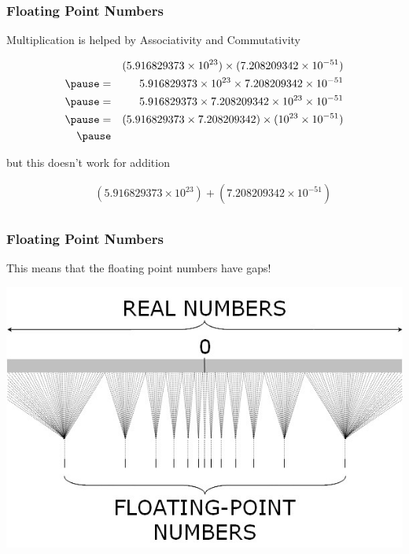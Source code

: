\documentclass{beamer}
\begin{document}
\begin{frame}

\frametitle{Floating Point Numbers}

Multiplication is helped by Associativity and Commutativity

\begin{eqnarray*}
     && (5.916829373 \times 10^{23}) \times (7.208209342 \times 10^{-51}) \\ \pause
  =  && 5.916829373 \times 10^{23} \times 7.208209342 \times 10^{-51} \\ \pause
  =  && 5.916829373 \times 7.208209342 \times 10^{23} \times 10^{-51} \\ \pause
  =  && (5.916829373 \times 7.208209342) \times (10^{23} \times 10^{-51}) \\ \pause
\end{eqnarray*}

but this doesn't work for addition \pause

\begin{eqnarray*}
      && (5.916829373 \times 10^{23}) + (7.208209342 \times 10^{-51}) \\
\end{eqnarray*}

\end{frame}

\begin{frame}

\frametitle{Floating Point Numbers}

This means that the floating point numbers have gaps!

\begin{center}
\includegraphics[scale=.6]{float-gaps.jpg}
\end{center}

\end{frame}
\end{document}
